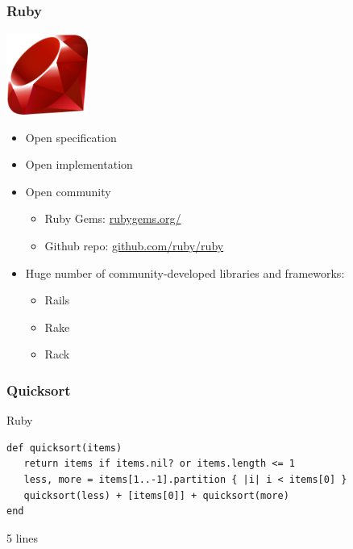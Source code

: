 \documentclass{beamer}
\begin{document}
\begin{frame}
  \frametitle{Ruby}
  \begin{center} 
    \includegraphics[width=0.2\textwidth]{../img/ruby}

    \begin{itemize}
    \item Open specification
    \item Open implementation
    \item Open community
      \begin{itemize}
      \item Ruby Gems: \href{http://rubygems.org/}{rubygems.org/}
      \item Github repo: \href{https://github.com/ruby/ruby}{github.com/ruby/ruby}
      \end{itemize}
    \item Huge number of community-developed libraries and frameworks:
      \begin{itemize}
      \item Rails
      \item Rake
      \item Rack
      \end{itemize}
    \end{itemize}
  \end{center}
\end{frame}

\begin{frame}[fragile]
  \frametitle{Quicksort}
  \begin{block}{Ruby}


    \begin{footnotesize}
\begin{verbatim}
def quicksort(items)
   return items if items.nil? or items.length <= 1
   less, more = items[1..-1].partition { |i| i < items[0] }
   quicksort(less) + [items[0]] + quicksort(more)
end
\end{verbatim}
    \end{footnotesize}
  \end{block}

  \vspace{2em}

  5 lines


\end{frame}
\end{document}

